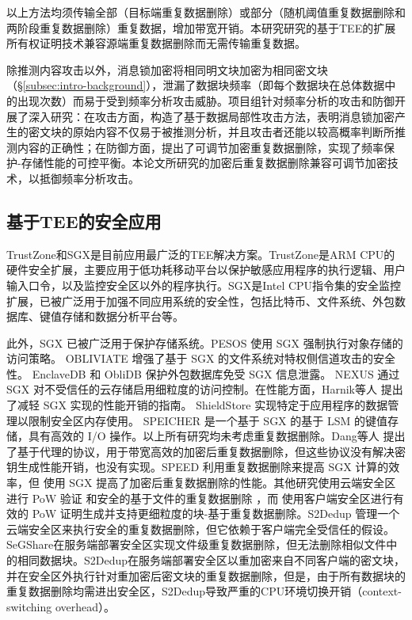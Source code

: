 以上方法均须传输全部（目标端重复数据删除）或部分（随机阈值重复数据删除和两阶段重复数据删除）重复数据，增加带宽开销。本研究研究的基于TEE的扩展所有权证明技术兼容源端重复数据删除而无需传输重复数据。 

除推测内容攻击以外，消息锁加密将相同明文块加密为相同密文块（\S\ref{subsec:intro-background}），泄漏了数据块频率（即每个数据块在总体数据中的出现次数）而易于受到频率分析攻击威胁。项目组针对频率分析的攻击和防御开展了深入研究：在攻击方面，构造了基于数据局部性攻击方法，表明消息锁加密产生的密文块的原始内容不仅易于被推测分析\cite{li2020Info}，并且攻击者还能以较高概率判断所推测内容的正确性\cite{li2022revisiting}；在防御方面，提出了可调节加密重复数据删除\cite{li2020balancing}，实现了频率保护-存储性能的可控平衡。本论文所研究的加密后重复数据删除兼容可调节加密技术，以抵御频率分析攻击。

\subsection{基于TEE的安全应用}
\label{subsec:compare-tee}

TrustZone和SGX是目前应用最广泛的TEE解决方案\cite{pinto19}。TrustZone是ARM CPU的硬件安全扩展，主要应用于低功耗移动平台以保护敏感应用程序的执行逻辑\cite{rubinov2016automated}、用户输入口令\cite{ying2018truz}，以及监控安全区以外的程序执行\cite{azab2014hypervision}。SGX是Intel CPU指令集的安全监控扩展，已被广泛用于加强不同应用系统的安全性，包括比特币\cite{matetic19}、文件系统\cite{ahmad18,shinde20}、外包数据库\cite{eskandarian17,priebe18,sun21}、键值存储\cite{mishra18,bailleu19,kim19,bailleu21}和数据分析平台\cite{schuster15, zheng17, bowe20}等。

此外，SGX \cite{sgx} 已被广泛用于保护存储系统。PESOS \cite{krahn18} 使用 SGX 强制执行对象存储的访问策略。 OBLIVIATE \cite{ahmad18} 增强了基于 SGX 的文件系统对特权侧信道攻击的安全性。 EnclaveDB \cite{priebe18} 和 ObliDB \cite{eskandarian19} 保护外包数据库免受 SGX 信息泄露。 NEXUS \cite{djoko19} 通过 SGX 对不受信任的云存储启用细粒度的访问控制。在性能方面，Harnik等人\cite{harnik18} 提出了减轻 SGX 实现的性能开销的指南。 ShieldStore \cite{kim19} 实现特定于应用程序的数据管理以限制安全区内存使用。 SPEICHER \cite{bailleu19} 是一个基于 SGX 的基于 LSM 的键值存储，具有高效的 I/O 操作。以上所有研究均未考虑重复数据删除。Dang等人\cite{dang17} 提出了基于代理的协议，用于带宽高效的加密后重复数据删除，但这些协议没有解决密钥生成性能开销，也没有实现。SPEED \cite{cui19} 利用重复数据删除来提高 SGX 计算的效率，但 \sysnameS 使用 SGX 提高了加密后重复数据删除的性能。其他研究使用云端安全区进行 PoW 验证 \cite{you20} 和安全的基于文件的重复数据删除 \cite{fuhry20}，而 \sysnameS 使用客户端安全区进行有效的 PoW 证明生成并支持更细粒度的块-基于重复数据删除。S2Dedup \cite{miranda21} 管理一个云端安全区来执行安全的重复数据删除，但它依赖于客户端完全受信任的假设。SeGShare\cite{fuhry2020segshare}在服务端部署安全区实现文件级重复数据删除，但无法删除相似文件中的相同数据块。S2Dedup\cite{miranda21}在服务端部署安全区以重加密来自不同客户端的密文块，并在安全区外执行针对重加密后密文块的重复数据删除，但是，由于所有数据块的重复数据删除均需进出安全区，S2Dedup导致严重的CPU环境切换开销（context-switching overhead）\cite{weisse2017regaining}。

